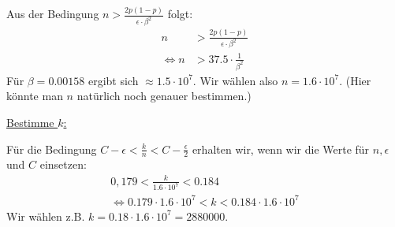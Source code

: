 \begin{myList}
Aus der Bedingung $n > \frac{2p(1-p)}{\epsilon \cdot \beta^2}$ folgt:
\begin{align*}
	n &> \frac{2p(1-p)}{\epsilon \cdot \beta^2}\\
	\Leftrightarrow n &> 37.5 \cdot \frac{1}{\beta^2}
\end{align*}
Für $\beta = 0.00158$ ergibt sich $\approx 1.5 \cdot 10^7$.
Wir wählen also $n = 1.6\cdot 10^7$.
(Hier könnte man $n$ natürlich noch genauer bestimmen.)

\underline{Bestimme $k$:}

Für die Bedingung $C - \epsilon < \frac{k}{n} < C - \frac{\epsilon}{2}$ erhalten wir, wenn wir die Werte für $n, \epsilon$ und $C$ einsetzen:
\begin{align*}
	0,179 < \frac{k}{1.6\cdot 10^7} < 0.184 \\
	\Leftrightarrow 0.179 \cdot 1.6\cdot 10^7 < k < 0.184 \cdot 1.6\cdot 10^7
\end{align*}
Wir wählen z.B. $k = 0.18 \cdot 1.6 \cdot 10^7 = 2 880 000$.
\end{myList}

